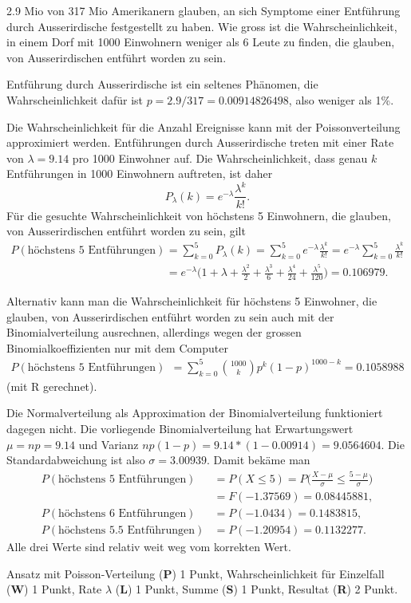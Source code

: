 2.9 Mio von 317 Mio Amerikanern glauben, an sich Symptome einer 
Entführung durch Ausserirdische festgestellt zu haben.
Wie gross ist die Wahrscheinlichkeit, in einem Dorf mit 1000
Einwohnern weniger als 6 Leute zu finden, die glauben, von
Ausserirdischen entführt worden zu sein.


\begin{loesung}
Entführung durch Ausserirdische ist ein seltenes Phänomen,
die Wahrscheinlichkeit dafür ist $p=2.9/317=0.00914826498$, also
weniger als 1\%.

Die Wahrscheinlichkeit für die Anzahl Ereignisse kann mit der
Poissonverteilung approximiert werden. Entführungen durch
Ausserirdische treten mit einer Rate von $\lambda = 9.14$ pro 1000 Einwohner
auf. Die Wahrscheinlichkeit, dass genau $k$ Entführungen in 1000
Einwohnern auftreten, ist daher
\[
P_\lambda(k)=e^{-\lambda}\frac{\lambda^k}{k!}.
\]
Für die gesuchte Wahrscheinlichkeit von höchstens 5 Einwohnern, die glauben,
von Ausserirdischen entführt worden zu sein, gilt
\begin{align*}
P(\text{höchstens 5 Entführungen})
&=
\sum_{k=0}^5P_\lambda(k)=\sum_{k=0}^5 e^{-\lambda}\frac{\lambda^k}{k!}
=e^{-\lambda}\sum_{k=0}^5\frac{\lambda^k}{k!}
\\
&=e^{-\lambda}\biggl(
1+\lambda+\frac{\lambda^2}{2}+\frac{\lambda^3}{6}+\frac{\lambda^4}{24}+\frac{\lambda^5}{120}
\biggr)
=0.106979.
\end{align*}

Alternativ kann man die Wahrscheinlichkeit für höchstens 5 Einwohner, die
glauben, von Ausserirdischen entführt worden zu sein auch mit der
Binomialverteilung ausrechnen, allerdings wegen der grossen
Binomialkoeffizienten nur mit dem Computer
\begin{align*}
P(\text{höchstens 5 Entführungen})
&=
\sum_{k=0}^5\binom{1000}{k}p^k(1-p)^{1000-k}
=0.1058988
\end{align*}
(mit R gerechnet).

Die Normalverteilung als Approximation der Binomialverteilung funktioniert
dagegen nicht. Die vorliegende Binomialverteilung hat Erwartungswert
$\mu = np=9.14$ und Varianz $np(1-p)=9.14 * (1-0.00914)=9.0564604$.
Die Standardabweichung ist also $\sigma = 3.00939$. Damit bekäme man
\begin{align*}
P(\text{höchstens 5 Entführungen})
&=
P(X\le 5)=P\biggl(\frac{X-\mu}{\sigma}\le \frac{5-\mu}{\sigma}\biggr)\\
&=F(-1.37569)=0.08445881,
\\
P(\text{höchstens 6 Entführungen})
&=P(-1.0434)=0.1483815,
\\
P(\text{höchstens 5.5 Entführungen})
&=P(-1.20954)=0.1132277.
\end{align*}
Alle drei Werte sind relativ weit weg vom korrekten Wert.
\end{loesung}

\begin{bewertung}
Ansatz mit Poisson-Verteilung ({\bf P}) 1 Punkt,
Wahrscheinlichkeit für Einzelfall ({\bf W}) 1 Punkt,
Rate $\lambda$ ({\bf L}) 1 Punkt,
Summe ({\bf S}) 1 Punkt,
Resultat ({\bf R}) 2 Punkt.
\end{bewertung}

